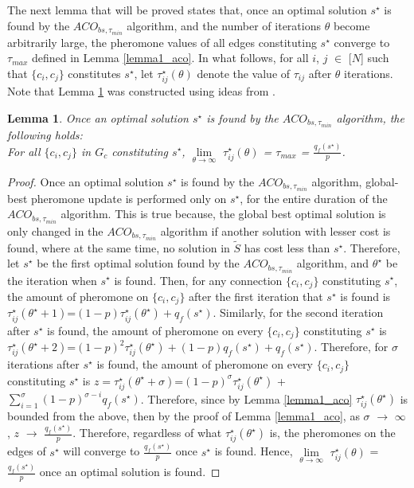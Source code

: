\documentclass[12pt]{article}
\newtheorem{lemma}[definition]{Lemma}
\numberwithin{equation}{subsection}
\numberwithin{table}{subsection}
\numberwithin{algorithm}{subsection}
\numberwithin{figure}{subsection}
\begin{document}
The next lemma that will be proved states that, once an optimal solution $s^\star$ is found by the $ACO_{bs, \tau_{min}}$ algorithm, and the number of iterations $\theta$ become arbitrarily large, the pheromone values of all edges constituting $s^\star$ converge to $\tau_{max}$ defined in Lemma \ref{lemma1_aco}. In what follows, for all $i$, $j$ $\in$ [$N$] such that $\{c_i, c_j\}$ constitutes $s^\star$, let $\tau_{ij}^\star(\theta)$ denote the value of $\tau_{ij}$ after $\theta$ iterations. Note that Lemma \ref{lemma2_aco} was constructed using ideas from \cite{dorigo_stutzle_thomas_2004}.
\begin{lemma}
\label{lemma2_aco}
Once an optimal solution $s^\star$ is found by the $ACO_{bs, \tau_{min}}$ algorithm, the following holds:\\For all $\{c_i, c_j\}$ in $G_c$ constituting $s^\star$, $\lim\limits_{\theta\to\infty}$ $\tau_{ij}^\star(\theta)$ = $\tau_{max}$ = $\frac{q_f(s^\star)}{p}$. {}
\end{lemma}
\begin{proof}
Once an optimal solution $s^\star$ is found by the $ACO_{bs, \tau_{min}}$ algorithm, global-best pheromone update is performed only on $s^\star$, for the entire duration of the $ACO_{bs, \tau_{min}}$ algorithm. This is true because, the global best optimal solution is only changed in the $ACO_{bs, \tau_{min}}$ algorithm if another solution with lesser cost is found, where at the same time, no solution in $\widetilde{S}$ has cost less than $s^\star$. Therefore, let $s^\star$ be the first optimal solution found by the $ACO_{bs, \tau_{min}}$ algorithm, and $\theta^\star$ be the iteration when $s^\star$ is found. Then, for any connection $\{c_i, c_j\}$ constituting $s^\star$, the amount of pheromone on $\{c_i, c_j\}$ after the first iteration that $s^\star$ is found is $\tau_{ij}^\star(\theta^\star + 1)$=$(1-p)\tau_{ij}^\star(\theta^\star) + q_f(s^\star)$. Similarly, for the second iteration after $s^\star$ is found, the amount of pheromone on every $\{c_i, c_j\}$ constituting $s^\star$ is $\tau_{ij}^\star(\theta^\star + 2)$=$(1-p)^2\tau_{ij}^\star(\theta^\star) + (1-p)q_f(s^\star) + q_f(s^\star)$. Therefore, for $\sigma$ iterations after $s^\star$ is found, the amount of pheromone on every $\{c_i, c_j\}$ constituting $s^\star$ is $ z = \tau_{ij}^\star(\theta^\star + \sigma)$=$(1-p)^\sigma\tau_{ij}^\star(\theta^\star)$ + $\sum_{i=1}^{\sigma} (1-p)^{\sigma-i}q_f(s^\star)$. Therefore, since by Lemma \ref{lemma1_aco} $\tau_{ij}^\star(\theta^\star)$ is bounded from the above, then by the proof of Lemma \ref{lemma1_aco}, as $\sigma$ $\to$ $\infty$, $z$ $\to$ $\frac{q_f(s^\star)}{p}$. Therefore, regardless of what $\tau_{ij}^\star(\theta^\star)$ is, the pheromones on the edges of $s^\star$ will converge to $\frac{q_f(s^\star)}{p}$ once $s^\star$ is found. Hence, $\lim\limits_{\theta\to\infty}$ $\tau_{ij}^\star(\theta)$ = $\frac{q_f(s^\star)}{p}$ once an optimal solution is found.
\end{proof}
\end{document}
